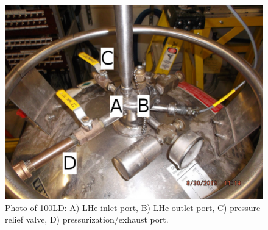  \begin{figure}[h]
 \centering
 \begin{minipage}{.50\textwidth}
 \includegraphics[width=\textwidth]{./img/100LD-photo.jpg}
 \caption{Photo of 100LD: A) LHe inlet port, B) LHe outlet port, C) pressure relief valve, D) pressurization/exhaust port.}
 \label{fig:100LD-photo}
 \end{minipage}
 \quad
  \begin{minipage}{.35\textwidth}

\end{minipage}
\end{figure}
